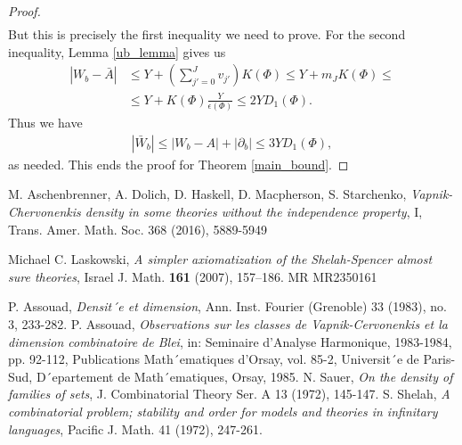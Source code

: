 \documentclass{amsart}
\newcommand{\BA}{\bar A}
\newcommand{\ppp}{\partial}
\newcommand{\paren}[1]{\left(#1\right)}
\newcommand{\abs}[1]{\left|#1\right|}
\begin{document}
\begin{proof}
\begin{align*}
  \end{align*}
  But this is precisely the first inequality we need to prove.
  For the second inequality, Lemma \ref{ub_lemma} gives us
  \begin{align*}
    \abs{W_b - \BA} &\leq Y + \paren{\sum_{j'=0}^J v_{j'}} K(\Phi) \leq Y + m_J K(\Phi) \leq \\
    &\leq Y + K(\Phi) \frac{Y}{\epsilon(\Phi)} \leq 2 Y D_1(\Phi).
  \end{align*}
  Thus we have
  \begin{align*}
      |\bar W_b| \leq \abs{W_b - A} + \abs{\ppp_b} \leq 3 Y D_1(\Phi),
  \end{align*}
  as needed.
  This ends the proof for Theorem \ref{main_bound}.
\end{proof}



\begin{thebibliography}{9}

  M. Aschenbrenner, A. Dolich, D. Haskell, D. Macpherson, S. Starchenko,
  \textit{Vapnik-Chervonenkis density in some theories without the independence property}, I,
  Trans. Amer. Math. Soc. 368 (2016), 5889-5949
  
  Michael C. Laskowski, \textit{A simpler axiomatization of the Shelah-Spencer almost sure theories},
  Israel J. Math. \textbf{161} (2007), 157–186. MR MR2350161	

  P. Assouad, \textit{Densit´e et dimension}, Ann. Inst. Fourier (Grenoble) 33 (1983), no. 3, 233-282.
  P. Assouad, \textit{Observations sur les classes de Vapnik-Cervonenkis et la dimension combinatoire de Blei},
  in: Seminaire d’Analyse Harmonique, 1983-1984, pp. 92-112, Publications Math´ematiques
  d’Orsay, vol. 85-2, Universit´e de Paris-Sud, D´epartement de Math´ematiques, Orsay, 1985.
  N. Sauer, \textit{On the density of families of sets}, J. Combinatorial Theory Ser. A 13 (1972), 145-147.
  S. Shelah, \textit{A combinatorial problem; stability and order for models and theories in infinitary languages},
  Pacific J. Math. 41 (1972), 247-261.

\end{thebibliography}
\end{document}
